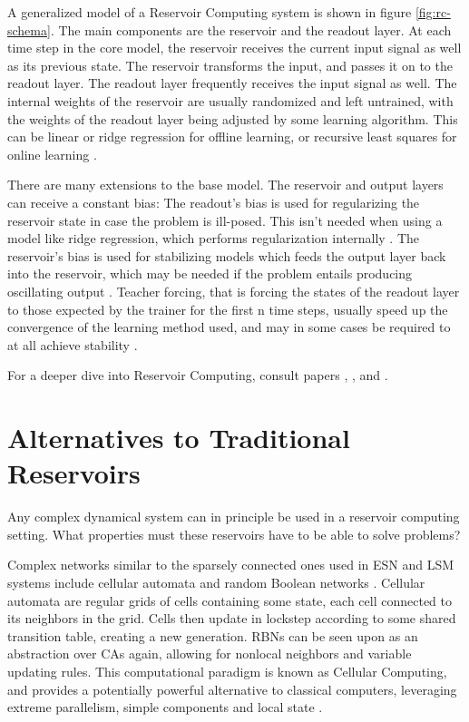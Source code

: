 A generalized model of a Reservoir Computing system is shown in figure \ref{fig:rc-schema}.
The main components are the reservoir and the readout layer.
At each time step in the core model,
the reservoir receives the current input signal as well as its previous state.
The reservoir transforms the input, and passes it on to the readout layer.
The readout layer frequently receives the input signal as well.
The internal weights of the reservoir are usually randomized and left untrained,
with the weights of the readout layer being adjusted by some learning algorithm.
This can be linear or ridge regression for offline learning,
or recursive least squares for online learning \cite{Schrauwen2007}.

There are many extensions to the base model.
The reservoir and output layers can receive a constant bias:
The readout's bias is used for regularizing the reservoir state in case the problem is ill-posed.
This isn't needed when using a model like ridge regression, which performs regularization internally \cite{Schrauwen2007}.
The reservoir's bias is used for stabilizing models which feeds the output layer back into the reservoir,
which may be needed if the problem entails producing oscillating output \cite{Jaeger:2007}.
Teacher forcing,
that is forcing the states of the readout layer to those expected by the trainer for the first n time steps,
usually speed up the convergence of the learning method used,
and may in some cases be required to at all achieve stability \cite{jaeger2002tutorial}.

For a deeper dive into Reservoir Computing,
consult papers \cite{Schrauwen2007}, \cite{lukovsevivcius2012reservoir}, and \cite{Jaeger:2007}.

\section{Alternatives to Traditional Reservoirs}

Any complex dynamical system can in principle be used in a reservoir computing setting.
What properties must these reservoirs have to be able to solve problems?

Complex networks similar to the sparsely connected ones used in ESN and LSM systems include cellular automata \cite{wolfram2002new} and random Boolean networks \cite{kauffman1969metabolic}.
Cellular automata are regular grids of cells containing some state,
each cell connected to its neighbors in the grid.
Cells then update in lockstep according to some shared transition table,
creating a new generation.
RBNs can be seen upon as an abstraction over CAs again,
allowing for nonlocal neighbors and variable updating rules.
This computational paradigm is known as Cellular Computing,
and provides a potentially powerful alternative to classical computers,
leveraging extreme parallelism, simple components and local state \cite{sipper1999emergence}.

